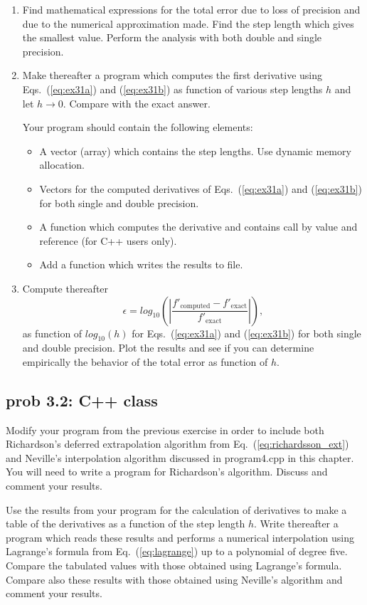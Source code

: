 \begin{enumerate}
\item Find mathematical expressions for the total error due to loss
of precision and due to the numerical approximation made.
Find the step length which gives the smallest value.
Perform the analysis with both double and single precision.

\item Make thereafter a program 
which computes the first derivative using Eqs.~(\ref{eq:ex31a}) and (\ref{eq:ex31b}) 
as function of various step lengths $h$ and let $h\rightarrow 0$.
Compare with the exact answer.

Your program should contain the following elements:  
\begin{itemize}
 \item A vector (array)  which contains the step lengths. 
Use dynamic memory allocation.
 \item Vectors for the computed derivatives of Eqs.~(\ref{eq:ex31a}) and (\ref{eq:ex31b}) 
for both single and double precision.
\item A function which computes the derivative and contains call by value and reference 
(for C++ users only).

 \item Add a function which writes the results to file.
\end{itemize}
\item Compute thereafter
\[
   \epsilon=log_{10}\left(\left|\frac{f'_{\mathrm{computed}}-f'_{\mathrm{exact}}}
                 {f'_{\mathrm{exact}}}\right|\right),
\]
as function of  $log_{10}(h)$ for Eqs.~(\ref{eq:ex31a}) and (\ref{eq:ex31b})  
for both single and double precision.
Plot the results and see if you can determine empirically 
the behavior of the total error as function of $h$.
\end{enumerate}



\subsection*{prob 3.2: C++ class}
Modify your program from the previous exercise in order to include both Richardson's deferred
extrapolation algorithm from Eq.~(\ref{eq:richardsson_ext}) and Neville's interpolation algorithm
discussed in program4.cpp in this chapter. 
You will need to write a program for Richardson's algorithm.
Discuss and comment your results. 


Use the results from your program for the calculation of derivatives to 
make a table of the derivatives as a function of the step length $h$. 
Write thereafter a program which reads these results and performs a numerical interpolation
using Lagrange's formula from Eq.~(\ref{eq:lagrange}) up to a polynomial of degree five.
Compare the tabulated values with those obtained using Lagrange's formula.
Compare also these results with those obtained using Neville's algorithm and comment your results. 


